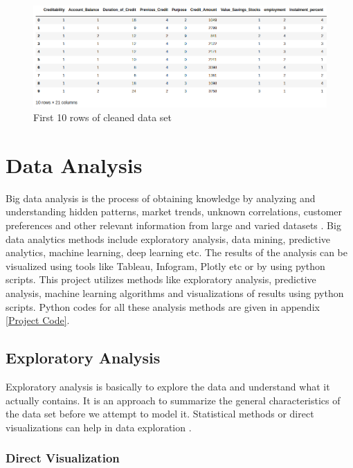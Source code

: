 \documentclass[sigconf]{acmart}
\begin{document}
\begin{figure}[htb]
  \centering
  \includegraphics[width=1.0\columnwidth]{images/Figure8.png}
  \caption{First 10 rows of cleaned data set
  \cite{psu-site}}
  \label{fig:Figure8} 
\end{figure}


\section{Data Analysis}

Big data analysis is the process of obtaining knowledge by analyzing and understanding hidden patterns, market trends, unknown correlations, customer preferences and other relevant information from large and varied datasets \cite{bigdata-analytics}. Big data analytics methods include exploratory analysis, data mining, predictive analytics, machine learning, deep learning etc. The results of the analysis can be visualized using tools like Tableau, Infogram, Plotly etc or by using python scripts. This project utilizes methods like exploratory analysis, predictive analysis, machine learning algorithms and visualizations of results using python scripts. Python codes for all these analysis methods are given in appendix \ref{Project Code}.

\subsection{Exploratory Analysis}

Exploratory analysis is basically to explore the data and understand what it actually contains. It is an approach to summarize the general characteristics of the data set before we attempt to model it. Statistical methods or direct visualizations can help in data exploration \cite{exploratory-analysis}. 

\subsubsection{Direct Visualization}
\end{document}
